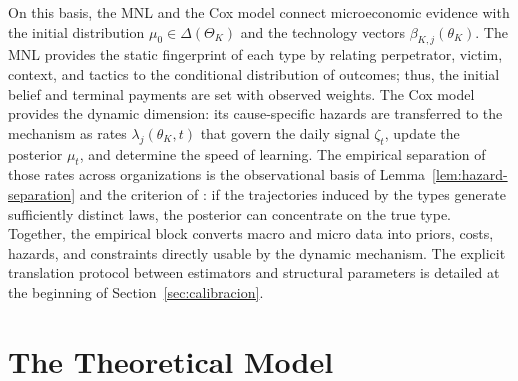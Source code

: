 \documentclass[ecta,nameyear,draft]{econsocart}
\theoremstyle{plain}
\theoremstyle{definition}
\newcommand{\ThetaK}{\Theta_K}
\newcommand{\1}{\mathbf{1}}
\begin{document}
On this basis, the MNL and the Cox model connect microeconomic evidence with the initial distribution $\mu_0\in\Delta(\ThetaK)$ and the technology vectors $\beta_{K,j}(\theta_K)$. The MNL provides the static fingerprint of each type by relating perpetrator, victim, context, and tactics to the conditional distribution of outcomes; thus, the initial belief and terminal payments are set with observed weights. The Cox model provides the dynamic dimension: its cause-specific hazards are transferred to the mechanism as rates $\lambda_j(\theta_K,t)$ that govern the daily signal $\zeta_t$, update the posterior $\mu_t$, and determine the speed of learning. The empirical separation of those rates across organizations is the observational basis of Lemma~\ref{lem:hazard-separation} and the criterion of \citet{Kakutani1948}: if the trajectories induced by the types generate sufficiently distinct laws, the posterior can concentrate on the true type. Together, the empirical block converts macro and micro data into priors, costs, hazards, and constraints directly usable by the dynamic mechanism. The explicit translation protocol between estimators and structural parameters is detailed at the beginning of Section~\ref{sec:calibracion}.

\section{The Theoretical Model}\label{sec:model}
\end{document}
